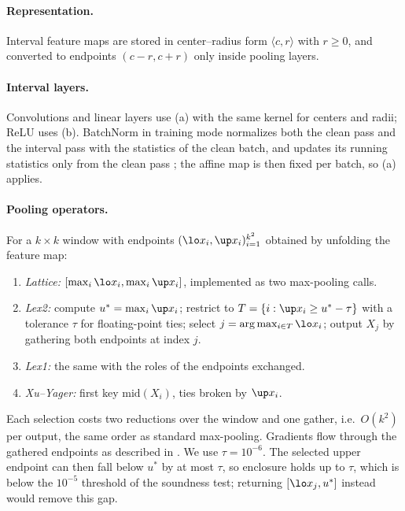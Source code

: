 \paragraph{Representation.} Interval feature maps are stored in center--radius form $\langle c,r\rangle$ with $r\ge0$, and converted to endpoints $(c-r,c+r)$ only inside pooling layers.

\paragraph{Interval layers.} Convolutions and linear layers use (a) with the same kernel for centers and radii; ReLU uses (b). BatchNorm in training mode normalizes both the clean pass and the interval pass with the statistics of the clean batch, and updates its running statistics only from the clean pass \cite{shi2021,ioffe2015}; the affine map is then fixed per batch, so (a) applies.

\paragraph{Pooling operators.} For a $k\times k$ window with endpoints $(\lo x_i,\up x_i)_{i=1}^{k^2}$ obtained by unfolding the feature map:
\begin{enumerate}[leftmargin=*]
\item \emph{Lattice:} $[\max_i\lo x_i,\max_i\up x_i]$, implemented as two max-pooling calls.
\item \emph{Lex2:} compute $u^*=\max_i\up x_i$; restrict to $T=\{i:\up x_i\ge u^*-\tau\}$ with a tolerance $\tau$ for floating-point ties; select $j=\arg\max_{i\in T}\lo x_i$; output $X_j$ by gathering both endpoints at index $j$.
\item \emph{Lex1:} the same with the roles of the endpoints exchanged.
\item \emph{Xu--Yager:} first key $\mathrm{mid}(X_i)$, ties broken by $\up x_i$.
\end{enumerate}
Each selection costs two reductions over the window and one gather, i.e.\ $O(k^2)$ per output, the same order as standard max-pooling. Gradients flow through the gathered endpoints as described in . We use $\tau=10^{-6}$. The selected upper endpoint can then fall below $u^*$ by at most $\tau$, so enclosure holds up to $\tau$, which is below the $10^{-5}$ threshold of the soundness test; returning $[\lo x_j,u^*]$ instead would remove this gap.

